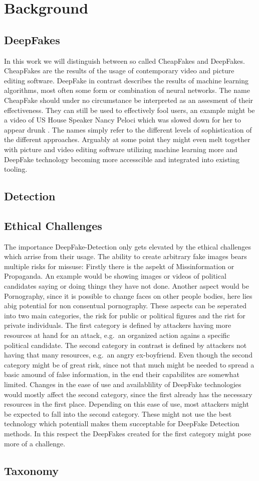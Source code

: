 \section{Background}
\subsection{DeepFakes}
In this work we will distinguish between so called CheapFakes and DeepFakes.
CheapFakes are the results of the usage of contemporary video and picture editing software.
DeepFake in contrast describes the results of machine learning algorithms, most 
often some form or combination of neural networks.
The name CheapFake should under no circumstance be interpreted as an assesment of
their effectiveness.
They can still be used to effectively fool users, an example might be a video
of US House Speaker Nancy Peloci which was slowed down for her to appear drunk .
The names simply refer to the different levels of sophistication of the different approaches.
Arguably at some point they might even melt together with picture and video editing software
utilizing machine learning more and DeepFake technology becoming more accesscible and integrated
into existing tooling.
\subsection{Detection}
\subsection{Ethical Challenges}
The importance DeepFake-Detection only gets elevated by the ethical challenges which arrise
from their usage.
The ability to create arbitrary fake images bears multiple risks for missuse:
Firstly there is the aspekt of Missinformation or Propaganda. 
An example would be showing images or videos of political candidates saying or doing things they have not done.
Another aspect would be Pornography, since it is possible to change faces on other people bodies, here lies abig potential for non consentual pornography.
These aspects can be seperated into two main categories, the risk for public or political figures and the rist for private individuals.
The first category is defined by attackers having more resources at hand for an attack, e.g.\ an organized action agains a specific political candidate.
The second category in contrast is defined by attackers not having that many resources, e.g.\ an angry ex-boyfriend.
Even though the second category might be of great risk, since not that much might be needed to spread
a basic amound of false information, in the end their capabilites are somewhat limited.
Changes in the ease of use and availablility of DeepFake technologies would mostly affect the second category,
since the first already has the necessary resources in the first place.
Depending on this ease of use, most attackers might be expected to fall into the second category.
These might not use the best technology which potentiall makes them succeptable for DeepFake Detection methods.
In this respect the DeepFakes created for the first category might pose more of a challenge.
 
\subsection{Taxonomy}
